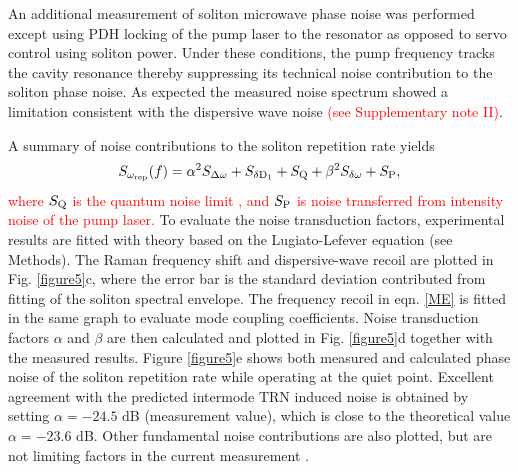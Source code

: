 \documentclass[noshowpacs,amsmath,
twocolumn,
superscriptaddress,
8pt,
aps,prb]{revtex4-2}
\begin{document}
An additional measurement of soliton microwave phase noise was performed except using PDH locking of the pump laser to the resonator as opposed to servo control using soliton power. Under these conditions, the pump frequency tracks the cavity resonance thereby suppressing its technical noise contribution to the soliton phase noise. As expected the measured noise spectrum showed a limitation consistent with the dispersive wave noise \textcolor{red}{(see Supplementary note II)}. 

A summary of noise contributions to the soliton repetition rate yields
\begin{equation}
    S_{\omega_{\rm rep}}(f) = \alpha^2 S_{\mathrm{\Delta\omega}}+S_{\mathrm{\delta D_1}}+S_{\rm Q}+\beta^{2}S_{\rm \delta\omega}+S_{\rm P},
    \label{noise_contribution}
\end{equation}
\textcolor{red}{where $S_{\rm Q}$ is the quantum noise limit \cite{matsko2013timing}, and $S_{\rm P}$ is noise transferred from intensity noise of the pump laser. } To evaluate the noise transduction factors, experimental results are fitted with theory based on the Lugiato-Lefever equation (see Methods). The Raman frequency shift and dispersive-wave recoil are plotted in Fig. \ref{figure5}c, where the error bar is the standard deviation contributed from fitting of the soliton spectral envelope. The frequency recoil in eqn. \ref{ME} is fitted in the same graph to evaluate mode coupling coefficients. Noise transduction factors $\alpha$ and $\beta$ are then calculated and plotted in Fig. \ref{figure5}d together with the measured results. 
Figure \ref{figure5}e shows both measured and calculated phase noise of the soliton repetition rate while operating at the quiet point. Excellent agreement with the predicted intermode TRN induced noise is obtained by setting $\alpha=-24.5$ dB (measurement value), which is close to the theoretical value $\alpha=-23.6$ dB. Other fundamental noise contributions are also plotted, but are not limiting factors in the current measurement \cite{gorodetsky2004fundamental,matsko2007whispering,matsko2013timing,kondratiev2018thermorefractive,huang2019thermorefractive}.

\medskip

\end{document}
